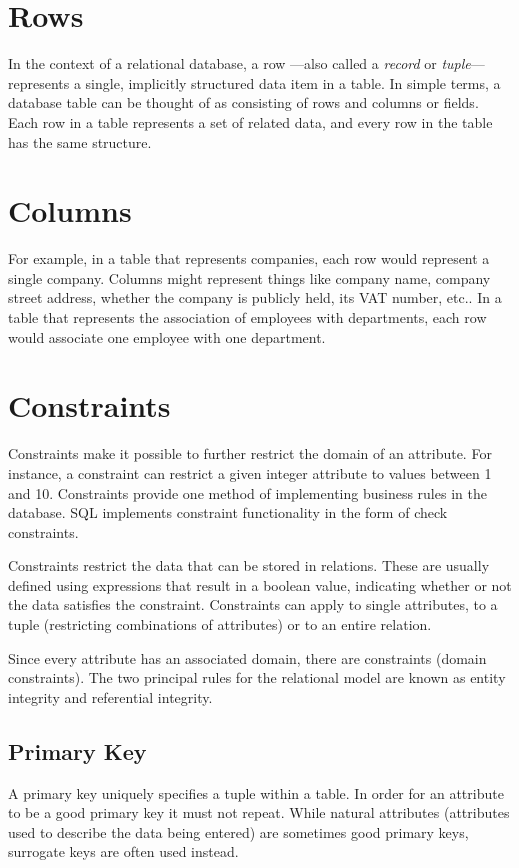 \documentclass[10pt,twoside,english]{_support/latex/sbabook/sbabook}
\begin{document}
\section{Rows}
In the context of a relational database, a row —also called a \textit{record} or
\textit{tuple}— represents a single, implicitly structured data item in a table.
In simple terms, a database table can be thought of as consisting of rows
and columns or fields. Each row in a table represents a set of related data,
and every row in the table has the same structure.
\section{Columns}
For example, in a table that represents companies, each row would represent a
single company. Columns might represent things like company name,
company street address, whether the company is publicly held, its VAT number,
etc.. In a table that represents the association of employees with departments,
each row would associate one employee with one department.
\section{Constraints}
Constraints make it possible to further restrict the domain of an attribute. For
instance, a constraint can restrict a given integer attribute to values between
1 and 10. Constraints provide one method of implementing business rules in the
database. SQL implements constraint functionality in the form of check
constraints.

Constraints restrict the data that can be stored in relations. These are usually
defined using expressions that result in a boolean value, indicating whether or
not the data satisfies the constraint. Constraints can apply to single
attributes, to a tuple (restricting combinations of attributes) or to an entire
relation.

 Since every attribute has an associated domain, there are constraints (domain
constraints). The two principal rules for the relational model are known as
entity integrity and referential integrity.
\subsection{Primary Key}
A primary key uniquely specifies a tuple within a table. In order for an attribute to be a good primary key it must not repeat. While
natural attributes (attributes used to describe the data being entered) are
sometimes good primary keys, surrogate keys are often used instead.
\end{document}
